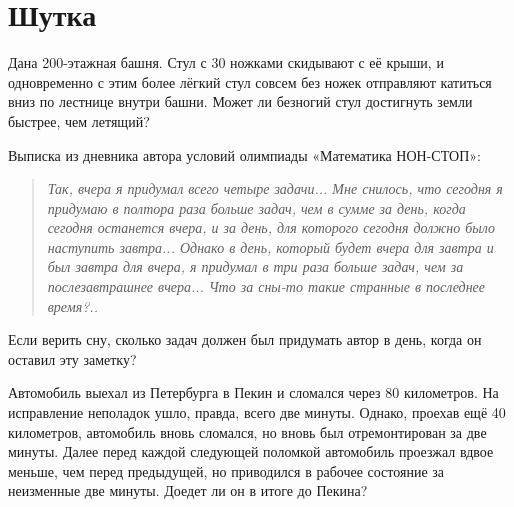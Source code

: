 \section{Шутка}

\begin{itemize}
\itA Дана 200-этажная башня. Стул с 30 ножками скидывают с её крыши, и одновременно с этим более лёгкий стул совсем без ножек отправляют катиться вниз по лестнице внутри башни. Может ли безногий стул достигнуть земли быстрее, чем летящий?

\itB Выписка из дневника автора условий олимпиады «Математика НОН-СТОП»:

\begin{quote}
\it
Так, вчера я придумал всего четыре задачи... Мне снилось, что сегодня я придумаю в полтора раза больше задач, чем в сумме за день, когда сегодня останется вчера, и за день, для которого сегодня должно было наступить завтра... Однако в день, который будет вчера для завтра и был завтра для вчера, я придумал в три раза больше задач, чем за послезавтрашнее вчера... Что за сны-то такие странные в последнее время?..
\end{quote}

\noindent Если верить сну, сколько задач должен был придумать автор в день, когда он оставил эту заметку?

\itC Автомобиль выехал из Петербурга в Пекин и сломался через 80 километров. На исправление неполадок ушло, правда, всего две минуты. Однако, проехав ещё 40 километров, автомобиль вновь сломался, но вновь был отремонтирован за две минуты. Далее перед каждой следующей поломкой автомобиль проезжал вдвое меньше, чем перед предыдущей, но приводился в рабочее состояние за неизменные две минуты. Доедет ли он в итоге до Пекина?
\end{itemize}